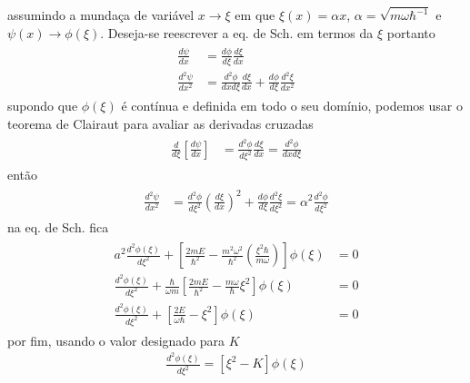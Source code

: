 \begin{prob}
\begin{sol}
\begin{enumerate}[label=\alph *)]
				assumindo a mundaça de variável $x\to \xi$ em que $\xi(x)=\alpha x$, $\alpha=\sqrt{m \omega \hbar^{-1}}$ e $\psi(x)\to \phi(\xi)$. Deseja-se reescrever a eq. de Sch. em termos da $\xi$ portanto
				\begin{align}
					\begin{split}
						\frac{d \psi}{dx} &= \frac{d \phi}{d \xi}\frac{d \xi}{dx}\\
						\frac{d^{2} \psi}{dx^{2}} &= \frac{d^{2} \phi}{dxd \xi}\frac{d \xi}{dx}+\frac{d \phi}{d \xi}\frac{d^{2} \xi}{dx^{2}}
					\end{split}
				\end{align}
				supondo que $\phi(\xi)$ é contínua e definida em todo o seu domínio, podemos usar o teorema de Clairaut para avaliar as derivadas cruzadas
				\begin{align}
						\begin{split}
							\frac{d}{d \xi}\left[\frac{d \psi}{dx}\right] &= \frac{d^{2} \phi}{d \xi^{2}}\frac{d \xi}{dx}= \frac{d^{2} \phi}{dxd \xi}
						\end{split}
				\end{align}
				então
				\begin{align}
						\begin{split}
							\frac{d^{2} \psi}{dx^{2}} &= \frac{d^{2} \phi}{d \xi^{2}}\left(\frac{d \xi}{dx}\right)^{2}+\frac{d \phi}{d \xi}\frac{d^{2} \xi}{d \xi^{2}}=\alpha^{2}\frac{d^{2} \phi}{d \xi^{2}}
						\end{split}
				\end{align}
				na eq. de Sch. fica
				\begin{align}
					\begin{split}
						a^{2}\frac{d^{2} \phi(\xi)}{d \xi^{2}}+\left[\frac{2mE}{\hbar^{2}}-\frac{m^{2} \omega^{2} }{\hbar^{2}}\left(\frac{\xi^{2}\hbar}{m \omega}\right)\right] \phi(\xi) &= 0\\
						\frac{d^{2} \phi(\xi)}{d \xi^{2}}+\frac{\hbar}{\omega m}\left[\frac{2mE}{\hbar^{2}}-\frac{m \omega}{\hbar} \xi^{2}\right] \phi(\xi) &= 0\\
						\frac{d^{2} \phi(\xi)}{d \xi^{2}}+\left[\frac{2E}{\omega \hbar}-\xi^{2}\right] \phi(\xi) &=0
					\end{split}						
				\end{align}
				por fim, usando o valor designado para $K$
				\begin{align}
						\boxed{
							\frac{d^{2} \phi(\xi)}{d \xi^{2}} = \left[\xi^{2}-K\right] \phi(\xi) \label{eq:p7-eq1}
						}
				\end{align}

\end{enumerate}
\end{sol}
\end{prob}
